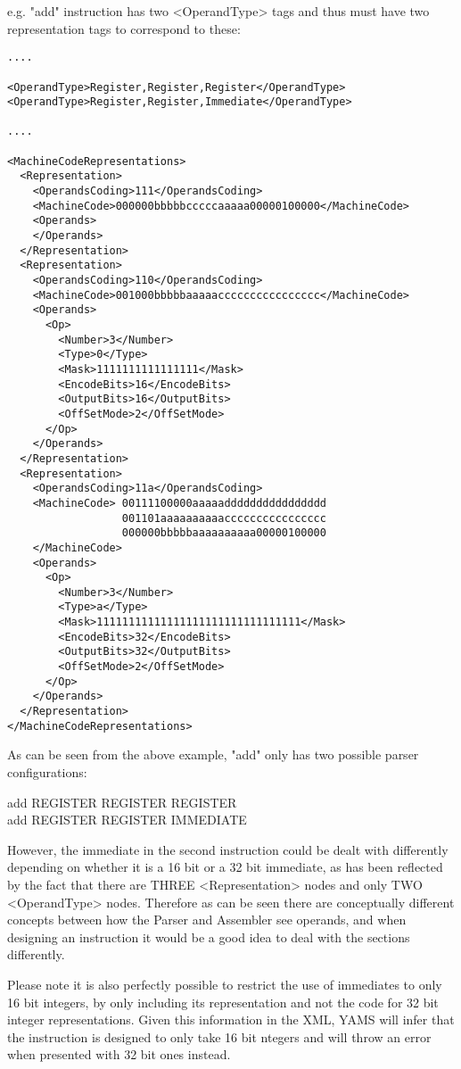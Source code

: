 \begin{enumerate}
e.g. "add" instruction has two <OperandType> tags and thus must have two representation tags to correspond to these:

\begin{verbatim}
....

<OperandType>Register,Register,Register</OperandType>
<OperandType>Register,Register,Immediate</OperandType>

....

<MachineCodeRepresentations>
  <Representation>
    <OperandsCoding>111</OperandsCoding>
    <MachineCode>000000bbbbbcccccaaaaa00000100000</MachineCode>
    <Operands>
    </Operands>
  </Representation>
  <Representation>
    <OperandsCoding>110</OperandsCoding>
    <MachineCode>001000bbbbbaaaaacccccccccccccccc</MachineCode>
    <Operands>
      <Op>
        <Number>3</Number>
        <Type>0</Type>
        <Mask>1111111111111111</Mask>
        <EncodeBits>16</EncodeBits>
        <OutputBits>16</OutputBits>
        <OffSetMode>2</OffSetMode>
      </Op>
    </Operands>
  </Representation>
  <Representation>
    <OperandsCoding>11a</OperandsCoding>
    <MachineCode> 00111100000aaaaadddddddddddddddd
                  001101aaaaaaaaaacccccccccccccccc
                  000000bbbbbaaaaaaaaaa00000100000
    </MachineCode>
    <Operands>
      <Op>
        <Number>3</Number>
        <Type>a</Type>
        <Mask>11111111111111111111111111111111</Mask>
        <EncodeBits>32</EncodeBits>
        <OutputBits>32</OutputBits>
        <OffSetMode>2</OffSetMode>
      </Op>
    </Operands>
  </Representation>
</MachineCodeRepresentations>
\end{verbatim}

As can be seen from the above example, "add" only has two possible parser configurations:

add REGISTER REGISTER REGISTER \\
add REGISTER REGISTER IMMEDIATE

However, the immediate in the second instruction could be dealt with differently depending on whether it is a 16 bit or a 32 bit immediate, as has been reflected by the fact that there are THREE <Representation> nodes and only TWO <OperandType> nodes. Therefore as can be seen there are conceptually different concepts between how the Parser and Assembler see operands, and when designing an instruction it would be a good idea to deal with the sections differently.

Please note it is also perfectly possible to restrict the use of immediates to only 16 bit integers, by only including its representation and not the code for 32 bit integer representations. Given this information in the XML, YAMS will infer that the instruction is designed to only take 16 bit ntegers and will throw an error when presented with 32 bit ones instead.


\end{enumerate}
